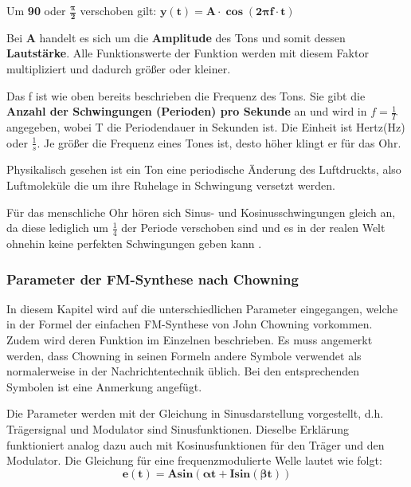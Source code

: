 Um \textbf{90\degree} oder $\bm{\frac{\pmb{\pi}}{2}}$ verschoben gilt: 		$\bm{y(t) = A\cdot \cos(2 \pmb{\pi} f\cdot t)}$

Bei $\bm{A}$ handelt es sich um die \textbf{Amplitude} des Tons und somit dessen \textbf{Lautstärke}. Alle Funktionswerte der Funktion werden mit diesem Faktor multipliziert und dadurch größer oder kleiner.

Das f ist wie oben bereits beschrieben die Frequenz des Tons. Sie gibt die \textbf{Anzahl der Schwingungen (Perioden) pro Sekunde} an und wird in $f=\frac{1}{T}$ angegeben, wobei T die Periodendauer in Sekunden ist. Die Einheit ist Hertz(Hz) oder $\frac{1}{s}$.
Je größer die Frequenz eines Tones ist, desto höher klingt er für das Ohr.

Physikalisch gesehen ist ein Ton eine periodische Änderung des Luftdruckts, also Luftmoleküle die um ihre Ruhelage in Schwingung versetzt werden\cite[s. 111 f.]{zwicker}. 

Für das menschliche Ohr hören sich Sinus- und Kosinusschwingungen gleich an, da diese lediglich um $\frac{1}{4}$ der Periode verschoben sind und es in der realen Welt ohnehin keine perfekten Schwingungen geben kann \cite[s. 3f.]{zwicker}. 
\subsubsection{Parameter der FM-Synthese nach Chowning}
\label{chowningparameter}

In diesem Kapitel wird auf die unterschiedlichen Parameter eingegangen, welche in der Formel der einfachen FM-Synthese von John Chowning vorkommen. Zudem wird deren Funktion im Einzelnen beschrieben. Es muss angemerkt werden, dass Chowning in seinen Formeln andere Symbole verwendet als normalerweise in der Nachrichtentechnik üblich. Bei den entsprechenden Symbolen ist eine Anmerkung angefügt.

Die Parameter werden mit der Gleichung in Sinusdarstellung vorgestellt, d.h. Trägersignal und Modulator sind Sinusfunktionen. Dieselbe Erklärung funktioniert analog dazu auch mit Kosinusfunktionen für den Träger und den Modulator.
Die Gleichung für eine frequenzmodulierte Welle lautet wie folgt:
\begin{equation} \bm{e(t) = A sin(\pmb{\alpha} t + I sin(\pmb{\beta} t))} \end{equation}

